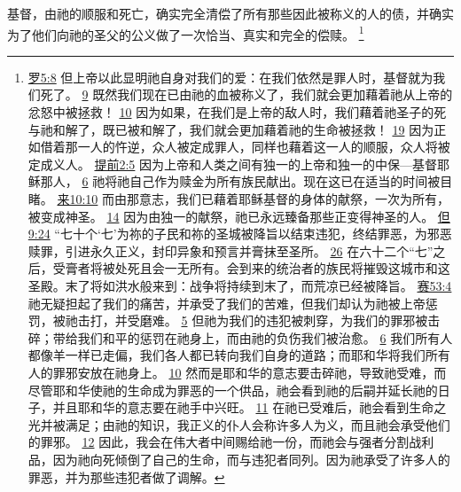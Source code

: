 \documentclass[12pt, a4paper, oneside]{ctexart}
\newcounter{parnum}[section]
\newcommand{\N}{%
   \noindent\refstepcounter{parnum}%
    \makebox[\parindent][l]{\textbf{\arabic{parnum}.}}}
\begin{document}
\N 基督，由祂的顺服和死亡，确实完全清偿了所有那些因此被称义的人的债，并确实为了他们向祂的圣父的公义做了一次恰当、真实和完全的偿赎。
	\footnote {
		\href{https://biblehub.com/romans/5-8.htm}{罗5:8} 但上帝以此显明祂自身对我们的爱：在我们依然是罪人时，基督就为我们死了。
		\href{https://biblehub.com/romans/5-9.htm}{9} 既然我们现在已由祂的血被称义了，我们就会更加藉着祂从上帝的忿怒中被拯救！
		\href{https://biblehub.com/romans/5-10.htm}{10} 因为如果，在我们是上帝的敌人时，我们藉着祂圣子的死与祂和解了，既已被和解了，我们就会更加藉着祂的生命被拯救！
		\href{https://biblehub.com/romans/5-19.htm}{19} 因为正如借着那一人的忤逆，众人被定成罪人，同样也藉着这一人的顺服，众人将被定成义人。
		\href{https://biblehub.com/1_timothy/2-5.htm}{提前2:5} 因为上帝和人类之间有独一的上帝和独一的中保---基督耶稣那人，
		\href{https://biblehub.com/1_timothy/2-6.htm}{6} 祂将祂自己作为赎金为所有族民献出。现在这已在适当的时间被目睹。
		\href{https://biblehub.com/hebrews/10-10.htm}{来10:10} 而由那意志，我们已藉着耶稣基督的身体的献祭，一次为所有，被变成神圣。
		\href{https://biblehub.com/hebrews/10-14.htm}{14} 因为由独一的献祭，祂已永远臻备那些正变得神圣的人。
		\href{https://biblehub.com/daniel/9-24.htm}{但9:24} “七十个‘七’为祢的子民和祢的圣城被降旨以结束违犯，终结罪恶，为邪恶赎罪，引进永久正义，封印异象和预言并膏抹至圣所。
		\href{https://biblehub.com/daniel/9-26.htm}{26} 在六十二个“七”之后，受膏者将被处死且会一无所有。会到来的统治者的族民将摧毁这城市和这圣殿。末了将如洪水般来到：战争将持续到末了，而荒凉已经被降旨。
		\href{https://biblehub.com/isaiah/53-4.htm}{赛53:4} 祂无疑担起了我们的痛苦，并承受了我们的苦难，但我们却认为祂被上帝惩罚，被祂击打，并受磨难。
		\href{https://biblehub.com/isaiah/53-5.htm}{5} 但祂为我们的违犯被刺穿，为我们的罪邪被击碎；带给我们和平的惩罚在祂身上，而由祂的负伤我们被治愈。
		\href{https://biblehub.com/isaiah/53-6.htm}{6} 我们所有人都像羊一样已走偏，我们各人都已转向我们自身的道路；而耶和华将我们所有人的罪邪安放在祂身上。
		\href{https://biblehub.com/isaiah/53-10.htm}{10} 然而是耶和华的意志要击碎祂，导致祂受难，而尽管耶和华使祂的生命成为罪恶的一个供品，祂会看到祂的后嗣并延长祂的日子，并且耶和华的意志要在祂手中兴旺。
		\href{https://biblehub.com/isaiah/53-11.htm}{11} 在祂已受难后，祂会看到生命之光并被满足；由祂的知识，我正义的仆人会称许多人为义，而且祂会承受他们的罪邪。
		\href{https://biblehub.com/isaiah/53-12.htm}{12} 因此，我会在伟大者中间赐给祂一份，而祂会与强者分割战利品，因为祂向死倾倒了自己的生命，而与违犯者同列。因为祂承受了许多人的罪恶，并为那些违犯者做了调解。
	}
\end{document}
